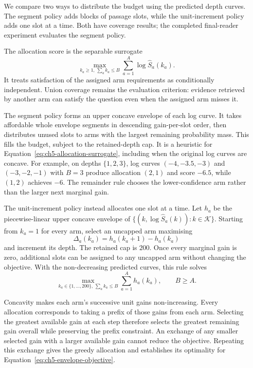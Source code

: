 We compare two ways to distribute the budget using the predicted depth
curves. The segment policy adds blocks of passage slots, while the
unit-increment policy adds one slot at a time. Both have coverage results;
the completed final-reader experiment evaluates the segment policy.

The allocation score is the separable surrogate
\begin{equation}
  \max_{k_a\geq1,\ \sum_a k_a\leq B}
       \sum_{a=1}^{A}\log\widehat S_a(k_a).
  \label{eq:ch5-allocation-surrogate}
\end{equation}
It treats satisfaction of the assigned arm requirements as conditionally
independent. Union coverage remains the evaluation criterion: evidence
retrieved by another arm can satisfy the question even when the assigned
arm misses it.

The segment policy forms an upper concave envelope of each log curve.
It takes affordable whole envelope segments in descending gain-per-slot
order, then distributes unused slots to arms with the largest remaining
probability mass. This fills the budget, subject to the retained-depth cap.
It is a heuristic for Equation~\ref{eq:ch5-allocation-surrogate}, including
when the original log curves are concave. For example, on depths
$\{1,2,3\}$, log curves $(-4,-3.5,-3)$ and $(-3,-2,-1)$ with $B=3$
produce allocation $(2,1)$ and score $-6.5$, while $(1,2)$ achieves $-6$.
The remainder rule chooses the lower-confidence arm rather than the larger
next marginal gain.

The unit-increment policy instead allocates one slot at a time. Let $h_a$
be the piecewise-linear upper concave envelope of
$\{(k,\log\widehat S_a(k)):k\in\mathcal K\}$. Starting from $k_a=1$
for every arm, select an uncapped arm maximising
\begin{equation}
  \Delta_a(k_a)=h_a(k_a+1)-h_a(k_a)
  \label{eq:ch5-unit-gain}
\end{equation}
and increment its depth. The retained cap is $200$. Once every marginal
gain is zero, additional slots can be assigned to any uncapped arm without
changing the objective. With the non-decreasing predicted curves, this rule
solves
\begin{equation}
  \max_{k_a\in\{1,\ldots,200\},\ \sum_a k_a\leq B}
       \sum_{a=1}^{A}h_a(k_a), \qquad B\geq A.
  \label{eq:ch5-envelope-objective}
\end{equation}

Concavity makes each arm's successive unit gains non-increasing. Every
allocation corresponds to taking a prefix of those gains from each arm.
Selecting the greatest available gain at each step therefore selects the
greatest remaining gain overall while preserving the prefix constraint.
An exchange of any smaller selected gain with a larger available gain
cannot reduce the objective. Repeating this exchange gives the greedy
allocation and establishes its optimality for
Equation~\ref{eq:ch5-envelope-objective}.

